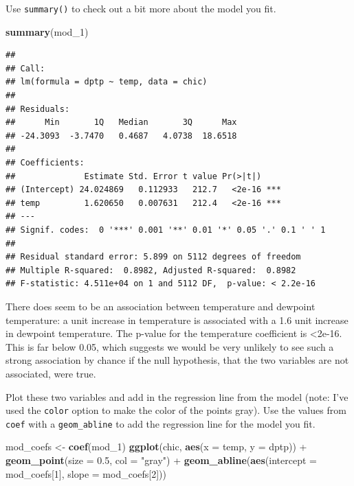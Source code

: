 \documentclass[]{book}
\makeatletter
\newenvironment{Shaded}{\begin{snugshade}}{\end{snugshade}}
\newcommand{\KeywordTok}[1]{\textcolor[rgb]{0.13,0.29,0.53}{\textbf{{#1}}}}
\newcommand{\DataTypeTok}[1]{\textcolor[rgb]{0.13,0.29,0.53}{{#1}}}
\newcommand{\DecValTok}[1]{\textcolor[rgb]{0.00,0.00,0.81}{{#1}}}
\newcommand{\FloatTok}[1]{\textcolor[rgb]{0.00,0.00,0.81}{{#1}}}
\newcommand{\StringTok}[1]{\textcolor[rgb]{0.31,0.60,0.02}{{#1}}}
\newcommand{\NormalTok}[1]{{#1}}
\newenvironment{kframe}{%
\medskip{}
\setlength{\fboxsep}{.8em}
 \def\at@end@of@kframe{}%
 \ifinner\ifhmode%
  \def\at@end@of@kframe{\end{minipage}}%
  \begin{minipage}{\columnwidth}%
 \fi\fi%
 \def\FrameCommand##1{\hskip\@totalleftmargin \hskip-\fboxsep
 \colorbox{shadecolor}{##1}\hskip-\fboxsep
     \hskip-\linewidth \hskip-\@totalleftmargin \hskip\columnwidth}%
 \MakeFramed {\advance\hsize-\width
   \@totalleftmargin\z@ \linewidth\hsize
   \@setminipage}}%
 {\par\unskip\endMakeFramed%
 \at@end@of@kframe}
\renewenvironment{Shaded}{\begin{kframe}}{\end{kframe}}
\makeatother
\begin{document}
Use \texttt{summary()} to check out a bit more about the model you fit.

\begin{Shaded}
\begin{Highlighting}[]
\KeywordTok{summary}\NormalTok{(mod_1)}
\end{Highlighting}
\end{Shaded}

\begin{verbatim}
## 
## Call:
## lm(formula = dptp ~ temp, data = chic)
## 
## Residuals:
##      Min       1Q   Median       3Q      Max 
## -24.3093  -3.7470   0.4687   4.0738  18.6518 
## 
## Coefficients:
##              Estimate Std. Error t value Pr(>|t|)    
## (Intercept) 24.024869   0.112933   212.7   <2e-16 ***
## temp         1.620650   0.007631   212.4   <2e-16 ***
## ---
## Signif. codes:  0 '***' 0.001 '**' 0.01 '*' 0.05 '.' 0.1 ' ' 1
## 
## Residual standard error: 5.899 on 5112 degrees of freedom
## Multiple R-squared:  0.8982, Adjusted R-squared:  0.8982 
## F-statistic: 4.511e+04 on 1 and 5112 DF,  p-value: < 2.2e-16
\end{verbatim}

There does seem to be an association between temperature and dewpoint
temperature: a unit increase in temperature is associated with a 1.6
unit increase in dewpoint temperature. The p-value for the temperature
coefficient is \textless{}2e-16. This is far below 0.05, which suggests
we would be very unlikely to see such a strong association by chance if
the null hypothesis, that the two variables are not associated, were
true.

Plot these two variables and add in the regression line from the model
(note: I've used the \texttt{color} option to make the color of the
points gray). Use the values from \texttt{coef} with a
\texttt{geom\_abline} to add the regression line for the model you fit.

\begin{Shaded}
\begin{Highlighting}[]
\NormalTok{mod_coefs <-}\StringTok{ }\KeywordTok{coef}\NormalTok{(mod_1)}
\KeywordTok{ggplot}\NormalTok{(chic, }\KeywordTok{aes}\NormalTok{(}\DataTypeTok{x =} \NormalTok{temp, }\DataTypeTok{y =} \NormalTok{dptp)) +}\StringTok{ }
\StringTok{  }\KeywordTok{geom_point}\NormalTok{(}\DataTypeTok{size =} \FloatTok{0.5}\NormalTok{, }\DataTypeTok{col =} \StringTok{"gray"}\NormalTok{) +}\StringTok{ }
\StringTok{  }\KeywordTok{geom_abline}\NormalTok{(}\KeywordTok{aes}\NormalTok{(}\DataTypeTok{intercept =} \NormalTok{mod_coefs[}\DecValTok{1}\NormalTok{], }\DataTypeTok{slope =} \NormalTok{mod_coefs[}\DecValTok{2}\NormalTok{]))}
\end{Highlighting}
\end{Shaded}
\end{document}
